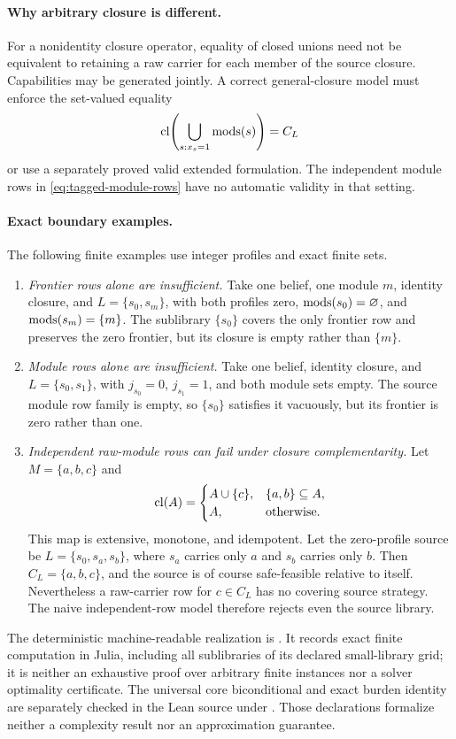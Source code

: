 \paragraph{Why arbitrary closure is different.}
For a nonidentity closure operator, equality of closed unions need not be
equivalent to retaining a raw carrier for each member of the source closure.
Capabilities may be generated jointly.  A correct general-closure model must
enforce the set-valued equality
\[
 \operatorname{cl}\!\left(\bigcup_{s:x_s=1}\operatorname{mods}(s)\right)=C_L
\]
or use a separately proved valid extended formulation.  The independent
module rows in \eqref{eq:tagged-module-rows} have no automatic validity in
that setting.

\paragraph{Exact boundary examples.}
The following finite examples use integer profiles and exact finite sets.

\begin{enumerate}
\item \emph{Frontier rows alone are insufficient.}  Take one belief, one
module \(m\), identity closure, and
\(L=\{s_0,s_m\}\), with both profiles zero,
\(\operatorname{mods}(s_0)=\varnothing\), and \(\operatorname{mods}(s_m)=\{m\}\).  The sublibrary
\(\{s_0\}\) covers the only frontier row and preserves the zero frontier, but
its closure is empty rather than \(\{m\}\).

\item \emph{Module rows alone are insufficient.}  Take one belief, identity
closure, and \(L=\{s_0,s_1\}\), with
\(j_{s_0}=0\), \(j_{s_1}=1\), and both module sets empty.  The source module
row family is empty, so \(\{s_0\}\) satisfies it vacuously, but its frontier
is zero rather than one.

\item \emph{Independent raw-module rows can fail under closure
complementarity.}  Let \(M=\{a,b,c\}\) and
\[
 \operatorname{cl}(A)=
 \begin{cases}
 A\cup\{c\},&\{a,b\}\subseteq A,\\
 A,&\text{otherwise}.
 \end{cases}
\]
This map is extensive, monotone, and idempotent.  Let the zero-profile source
be \(L=\{s_0,s_a,s_b\}\), where \(s_a\) carries only \(a\) and \(s_b\)
carries only \(b\).  Then \(C_L=\{a,b,c\}\), and the source is of course
safe-feasible relative to itself.  Nevertheless a raw-carrier row for
\(c\in C_L\) has no covering source strategy.  The naive independent-row
model therefore rejects even the source library.
\end{enumerate}

The deterministic machine-readable realization is
.  It records
exact finite computation in Julia, including all sublibraries of its declared
small-library grid; it is neither an exhaustive proof over arbitrary finite
instances nor a solver optimality certificate.  The universal core
biconditional and exact burden identity are separately checked in the Lean
source  under
.
Those declarations formalize neither a complexity result nor an
approximation guarantee.
